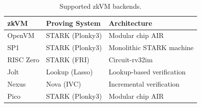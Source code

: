 \begin{table}[t]
\caption{Supported zkVM backends.}
\label{tbl:backends}
\centering
\small
\begin{tabular}{lll}
\toprule
\textbf{zkVM} & \textbf{Proving System} & \textbf{Architecture} \\
\midrule
OpenVM & STARK (Plonky3) & Modular chip AIR \\
SP1 & STARK (Plonky3) & Monolithic STARK machine \\
RISC Zero & STARK (FRI) & Circuit-rv32im \\
Jolt & Lookup (Lasso) & Lookup-based verification \\
Nexus & Nova (IVC) & Incremental verification \\
Pico & STARK (Plonky3) & Modular chip AIR \\
\bottomrule
\end{tabular}
\end{table}
